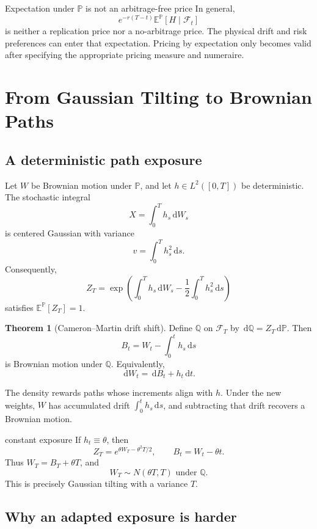 \documentclass[10pt]{article}
\newcommand{\E}{\mathbb E}
\newcommand{\Pp}{\mathbb P}
\newcommand{\Q}{\mathbb Q}
\newcommand{\1}{\mathbf 1}
\newcommand{\cF}{\mathcal F}
\newcommand{\dd}{\,\mathrm d}
\theoremstyle{definition}
\newtheorem{theorem}[definition]{Theorem}
\begin{document}
\begin{warningbox}{Expectation under \(\Pp\) is not an arbitrage-free price}
In general,
\[
e^{-r(T-t)}\E^{\Pp}[H\mid\cF_t]
\]
is neither a replication price nor a no-arbitrage price. The physical drift
and risk preferences can enter that expectation. Pricing by expectation only
becomes valid after specifying the appropriate pricing measure and numeraire.
\end{warningbox}

\section{From Gaussian Tilting to Brownian Paths}

\subsection{A deterministic path exposure}

Let \(W\) be Brownian motion under \(\Pp\), and let
\(h\in L^2([0,T])\) be deterministic. The stochastic integral
\[
X=\int_0^Th_s\dd W_s
\]
is centered Gaussian with variance
\[
v=\int_0^Th_s^2\dd s.
\]
Consequently,
\[
\boxed{
Z_T=\exp\!\left(
\int_0^Th_s\dd W_s-\frac12\int_0^Th_s^2\dd s
\right)}
\]
satisfies \(\E^{\Pp}[Z_T]=1\).

\begin{theorem}[Cameron--Martin drift shift]
Define \(\Q\) on \(\cF_T\) by \(\dd\Q=Z_T\dd\Pp\). Then
\[
\boxed{B_t=W_t-\int_0^th_s\dd s}
\]
is Brownian motion under \(\Q\). Equivalently,
\[
\boxed{\dd W_t=\dd B_t+h_t\dd t.}
\]
\end{theorem}

The density rewards paths whose increments align with \(h\). Under the new
weights, \(W\) has accumulated drift \(\int_0^th_s\dd s\), and subtracting
that drift recovers a Brownian motion.

\begin{boardexample}{constant exposure}
If \(h_t\equiv\theta\), then
\[
Z_T=e^{\theta W_T-\theta^2T/2},
\qquad
B_t=W_t-\theta t.
\]
Thus \(W_T=B_T+\theta T\), and
\[
\boxed{W_T\sim N(\theta T,T)\text{ under }\Q.}
\]
This is precisely Gaussian tilting with a variance \(T\).
\end{boardexample}

\subsection{Why an adapted exposure is harder}
\end{document}
